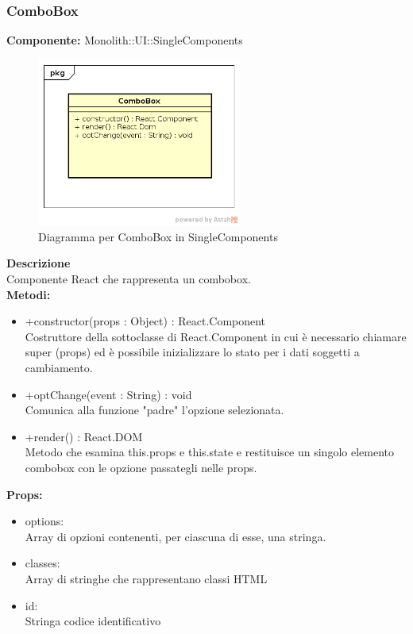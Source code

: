 \subsubsection{ComboBox}
\textbf{Componente:}  Monolith::UI::SingleComponents\\
   \FloatBarrier
   \begin{figure}[ht]
   \centering
   \includegraphics[width=0.6\textwidth]{img/single-ComboBox.png}
   \caption{{Diagramma per ComboBox in SingleComponents}}
\end{figure}
\FloatBarrier
\textbf{Descrizione}\\
Componente React che rappresenta un combobox. \\
\textbf{Metodi:} 
\begin{itemize}
\item +constructor(props : Object) : React.Component 
\\
Costruttore della sottoclasse di React.Component in cui è necessario chiamare super (props) ed è possibile inizializzare lo stato per i dati soggetti a cambiamento.

\item +optChange(event : String) : void  
\\
Comunica alla funzione "padre" l'opzione selezionata.

\item +render() : React.DOM 
\\
Metodo che esamina this.props e this.state e restituisce un singolo elemento combobox con le opzione passategli nelle props.

\end{itemize}

\textbf{Props:} 
\begin{itemize}
\item options: 
\\
Array di opzioni contenenti, per ciascuna di esse, una stringa.
\item classes: 
\\
Array di stringhe che rappresentano classi HTML
\item id:
\\
Stringa codice identificativo
\end{itemize} 


